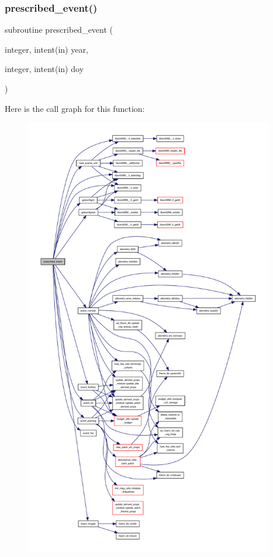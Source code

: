 \subsubsection{\texorpdfstring{prescribed\+\_\+event()}{prescribed\_event()}}
{\footnotesize\ttfamily subroutine prescribed\+\_\+event (\begin{DoxyParamCaption}\item[{integer, intent(in)}]{year,  }\item[{integer, intent(in)}]{doy }\end{DoxyParamCaption})}

Here is the call graph for this function\+:
\nopagebreak
\begin{figure}[H]
\begin{center}
\leavevmode
\includegraphics[height=550pt]{events_8f90_ad9f17e2da07d80a0734f81d8b2e27d25_cgraph}
\end{center}
\end{figure}
